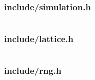 \documentclass[12pt]{article}
\begin{document}
\subsubsection{include/simulation.h}\label{sec:simulation.h}
\inputminted{c++}{include/simulation.h}
\subsubsection{include/lattice.h}\label{sec:lattice.h}
\inputminted{c++}{include/lattice.h}
\subsubsection{include/rng.h}\label{sec:rng.h}
\inputminted{c++}{include/rng.h}

\tableofcontents
\end{document}

